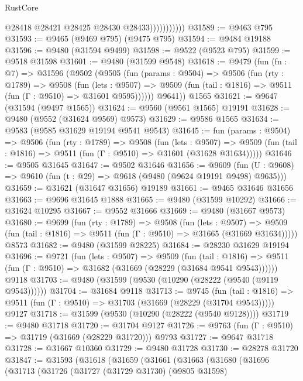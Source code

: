 \begin{lexlean}{RustCore}
\begin{coremodule}
                          @28418
                          @28421
                          @28425
                          @28430
                          @28433)))))))))))
@31589 := @9463 @795
@31593 := @9465 (@9469 @795) (@9475 @795)
@31594 := @9484 @19188
@31596 := @9480 (@31594 @9499)
@31598 := @9522 (@9523 @795)
@31599 := @9518 @31598
@31601 := @9480 (@31599 @9548)
@31618 := @9479
    (fun (fn : @7) =>
    @31596
      (@9502
        (@9505
          (fun (params : @9504) =>
          @9506
            (fun (rty : @1789) =>
            @9508
              (fun (lets : @9507) =>
              @9509 (fun (tail : @1816) => @9511 (fun (Γ : @9510) => @31601 @9595))))))
        @9641))
    @1565
@31621 := @9647 (@31594 (@9497 @1565))
@31624 := @9560 (@9561 @1565) @19191
@31628 := @9480 (@9552 (@31624 @9569) @9573)
@31629 := @9586 @1565
@31634 := @9583 (@9585 @31629 @19194 @9541 @9543)
@31645 := fun (params : @9504) =>
  @9506
    (fun (rty : @1789) =>
    @9508
      (fun (lets : @9507) =>
      @9509 (fun (tail : @1816) => @9511 (fun (Γ : @9510) => @31601 (@31628 @31634)))))
@31646 := @9505 @31645
@31647 := @9502 @31646
@31656 := @9609
    (fun (U : @9608) => @9610 (fun (t : @29) => @9618 (@9480 (@9624 @19191 @9498) @9635)))
@31659 := @31621 (@31647 @31656) @19189
@31661 := @9465 @31646 @31656
@31663 := @9696 @31645 @1888
@31665 := @9480 (@31599 @10292)
@31666 := @31624 @10295
@31667 := @9552 @31666
@31669 := @9480 (@31667 @9573)
@31680 := @9699
    (fun (rty : @1789) =>
    @9508
      (fun (lets : @9507) =>
      @9509 (fun (tail : @1816) => @9511 (fun (Γ : @9510) => @31665 (@31669 @31634)))))
    @8573
@31682 := @9480 (@31599 @28225)
@31684 := @28230 @31629 @19194
@31696 := @9721
    (fun (lets : @9507) =>
    @9509
      (fun (tail : @1816) =>
      @9511 (fun (Γ : @9510) => @31682 (@31669 (@28229 (@31684 @9541 @9543))))))
    @9118
@31703 := @9480 (@31599 (@9530 (@10290 (@28222 (@9540 (@9119 @9543))))))
@31704 := @31684 @9118
@31713 := @9745
    (fun (tail : @1816) => @9511 (fun (Γ : @9510) => @31703 (@31669 (@28229 (@31704 @9543)))))
    @9127
@31718 := @31599 (@9530 (@10290 (@28222 (@9540 @9128))))
@31719 := @9480 @31718
@31720 := @31704 @9127
@31726 := @9763 (fun (Γ : @9510) => @31719 (@31669 (@28229 @31720))) @9793
@31727 := @9647 @31718
@31728 := @31667 @10360
@31729 := @9480 @31728
@31730 := @28278 @31720
@31847 := @31593
    (@31618
      (@31659
        (@31661
          (@31663
            (@31680
              (@31696
                (@31713
                  (@31726
                    (@31727
                      (@31729 @31730)
                      (@9805 @31598)

\end{coremodule}
\end{lexlean}
